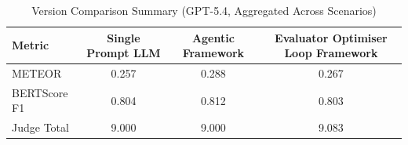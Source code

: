 \begin{table}[htbp]
\centering
\caption{Version Comparison Summary (GPT-5.4, Aggregated Across Scenarios)}
\label{tab:version_summary}
\begin{tabular}{lccc}
\toprule
Metric & Single Prompt LLM & Agentic Framework & Evaluator Optimiser Loop Framework \\
\midrule
METEOR & 0.257 & 0.288 & 0.267 \\
BERTScore F1 & 0.804 & 0.812 & 0.803 \\
Judge Total & 9.000 & 9.000 & 9.083 \\
\bottomrule
\end{tabular}
\end{table}